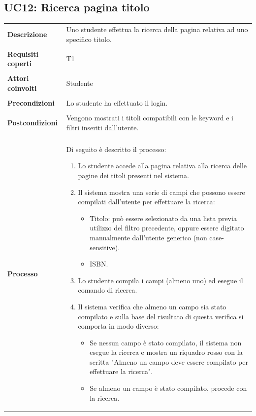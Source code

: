 \documentclass[10pt,a4paper]{report}
\begin{document}
	\subsection{UC12: Ricerca pagina titolo}
	\begin{tabular}{lp{}}
		\textbf{Descrizione}&Uno studente effettua la ricerca della pagina relativa ad uno specifico titolo.\\
		\\
		\textbf{Requisiti coperti}&T1\\
		\\
		\textbf{Attori coinvolti}&Studente\\
		\\
		\textbf{Precondizioni}&Lo studente ha effettuato il login.\\
		\\
		\textbf{Postcondizioni}&Vengono mostrati i titoli compatibili con le keyword e i filtri inseriti dall'utente.\\
		\\
		\textbf{Processo}&Di seguito è descritto il processo:
		\begin{enumerate}
			\item Lo studente accede alla pagina relativa alla ricerca delle pagine dei titoli presenti nel sistema.
			\item Il sistema mostra una serie di campi che possono essere compilati dall'utente per effettuare la ricerca:
			\begin{itemize}
				\item Titolo: può essere selezionato da una lista previa utilizzo del filtro precedente, oppure essere digitato manualmente dall'utente generico (non case-sensitive).
				\item ISBN.			
			\end{itemize}
			\item Lo studente compila i campi (almeno uno) ed esegue il comando di ricerca.
			\item Il sistema verifica che almeno un campo sia stato compilato e sulla base del risultato di questa verifica si comporta in modo diverso:
			\begin{itemize}
				\item Se nessun campo è stato compilato, il sistema non esegue la ricerca e mostra un riquadro rosso con la scritta "Almeno un campo deve essere compilato per effettuare la ricerca".
				\item Se almeno un campo è stato compilato, procede con la ricerca.
			\end{itemize}

\end{enumerate}
\end{tabular}
\end{document}

